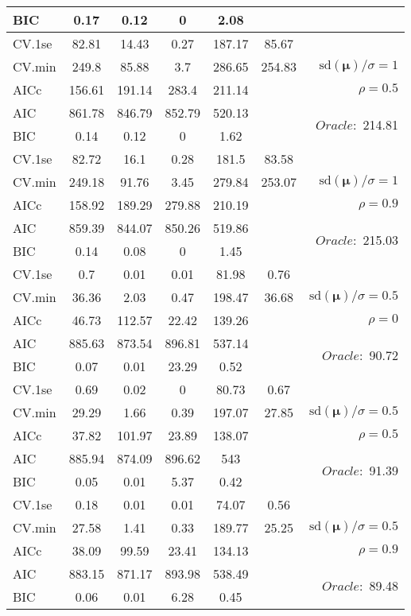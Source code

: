 \begin{table}
\begin{center}
\begin{tabular}{l*{5}{c}|r}
BIC & 0.17 & 0.12 & 0 & 2.08 & &  \\
 \hline 
CV.1se & 82.81 & 14.43 & 0.27 & 187.17 & 85.67 & \\
CV.min & 249.8 & 85.88 & 3.7 & 286.65 & 254.83 &  $\mathrm{sd}(\mathbf{\mu})/\sigma=1$ \\
AICc & 156.61 & 191.14 & 283.4 & 211.14 & & $\rho=0.5$ \\
AIC & 861.78 & 846.79 & 852.79 & 520.13 & &  \multirow{2}{*}{$Oracle: $ 214.81} \\
BIC & 0.14 & 0.12 & 0 & 1.62 & &  \\
 \hline 
CV.1se & 82.72 & 16.1 & 0.28 & 181.5 & 83.58 & \\
CV.min & 249.18 & 91.76 & 3.45 & 279.84 & 253.07 &  $\mathrm{sd}(\mathbf{\mu})/\sigma=1$ \\
AICc & 158.92 & 189.29 & 279.88 & 210.19 & & $\rho=0.9$ \\
AIC & 859.39 & 844.07 & 850.26 & 519.86 & &  \multirow{2}{*}{$Oracle: $ 215.03} \\
BIC & 0.14 & 0.08 & 0 & 1.45 & &  \\
 \hline 
CV.1se & 0.7 & 0.01 & 0.01 & 81.98 & 0.76 & \\
CV.min & 36.36 & 2.03 & 0.47 & 198.47 & 36.68 &  $\mathrm{sd}(\mathbf{\mu})/\sigma=0.5$ \\
AICc & 46.73 & 112.57 & 22.42 & 139.26 & & $\rho=0$ \\
AIC & 885.63 & 873.54 & 896.81 & 537.14 & &  \multirow{2}{*}{$Oracle: $ 90.72} \\
BIC & 0.07 & 0.01 & 23.29 & 0.52 & &  \\
 \hline 
CV.1se & 0.69 & 0.02 & 0 & 80.73 & 0.67 & \\
CV.min & 29.29 & 1.66 & 0.39 & 197.07 & 27.85 &  $\mathrm{sd}(\mathbf{\mu})/\sigma=0.5$ \\
AICc & 37.82 & 101.97 & 23.89 & 138.07 & & $\rho=0.5$ \\
AIC & 885.94 & 874.09 & 896.62 & 543 & &  \multirow{2}{*}{$Oracle: $ 91.39} \\
BIC & 0.05 & 0.01 & 5.37 & 0.42 & &  \\
 \hline 
CV.1se & 0.18 & 0.01 & 0.01 & 74.07 & 0.56 & \\
CV.min & 27.58 & 1.41 & 0.33 & 189.77 & 25.25 &  $\mathrm{sd}(\mathbf{\mu})/\sigma=0.5$ \\
AICc & 38.09 & 99.59 & 23.41 & 134.13 & & $\rho=0.9$ \\
AIC & 883.15 & 871.17 & 893.98 & 538.49 & &  \multirow{2}{*}{$Oracle: $ 89.48} \\
BIC & 0.06 & 0.01 & 6.28 & 0.45 & &  \\
 \hline 
\end{tabular}
\end{center}
\vspace{-1cm}
\end{table}





